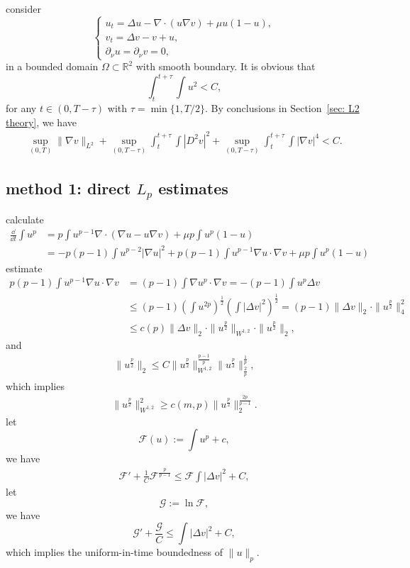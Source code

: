 consider 
\begin{equation}
	\begin{cases}
		u_t = \Delta u - \nabla\cdot(u\nabla v) + \mu u (1-u), \\
		v_t = \Delta v - v + u,\\
		\partial_\nu u = \partial_\nu v = 0,
	\end{cases}
\end{equation}
in a bounded domain $\Omega\subset\mathbb{R}^2$ with smooth boundary.
It is obvious that
\[
	\int_t^{t+\tau}\int u^2 < C,
\]
for any $t\in(0, T-\tau)$ with $\tau = \min\{1, T/2\}$.
By conclusions in Section~\ref{sec: L2 theory}, 
we have 
\begin{align*}
	\sup_{(0,T)}\|\nabla v\|_{L^2} 
	+ \sup_{(0,T-\tau)}\int_t^{t+\tau}\int |D^2v|^2 
	+ \sup_{(0, T-\tau)}\int_t^{t+\tau}\int |\nabla v|^4 < C.
\end{align*}


\subsection{method 1: direct \texorpdfstring{$L_p$}{Lp} estimates}
calculate
\begin{align*}
	\frac{\dd}{\dd t}\int u^p 
	&= p\int u^{p-1}\nabla\cdot(\nabla u - u\nabla v) + \mu p \int u^p(1-u)\\
	&= - p(p-1)\int u^{p-2}|\nabla u|^2 
		+ p(p-1) \int u^{p-1}\nabla u\cdot\nabla v 
		+ \mu p\int u^p(1-u)
\end{align*}
estimate
\begin{align*}
	p(p-1) \int u^{p-1}\nabla u\cdot\nabla v
	&= (p-1)\int \nabla u^p\cdot\nabla v
	 = -(p-1)\int u^p\Delta v\\
	&\leq (p-1)\left(\int u^{2p}\right)^{\frac12}\left(\int |\Delta v|^2\right)^\frac{1}{2}
	 = (p-1)\|\Delta v\|_2\cdot\|u^{\frac{p}{2}}\|_4^2\\
	&\leq c(p) \|\Delta v\|_2\cdot \|u^{\frac{p}{2}}\|_{W^{1,2}}\cdot\|u^{\frac{p}{2}}\|_2,
\end{align*}
and
\begin{align*}
	\|u^{\frac{p}{2}}\|_2 
	\leq C\|u^{\frac{p}{2}}\|_{W^{1,2}}^{\frac{p-1}{p}}\|u^{\frac{p}{2}}\|_{\frac2p}^{\frac1p},
\end{align*}
which implies 
\begin{align*}
	\|u^{\frac{p}{2}}\|_{W^{1,2}}^2 \geq c(m,p) \|u^{\frac{p}{2}}\|_2^{\frac{2p}{p-1}}.
\end{align*}
let 
\[
	\mathcal{F}(u) := \int u^p + c,
\]
we have
\begin{align*}
	\mathcal{F}' + \frac1C\mathcal{F}^\frac{p}{p-1} 
	\leq \mathcal{F} \int |\Delta v|^2 + C,
\end{align*}
let
\[
	\mathcal{G} := \ln\mathcal{F},
\]
we have 
\begin{equation*}
	\mathcal{G}' + \frac{\mathcal{G}}{C} \leq \int|\Delta v|^2 + C,
\end{equation*}
which implies the uniform-in-time boundedness of $\|u\|_p$.

